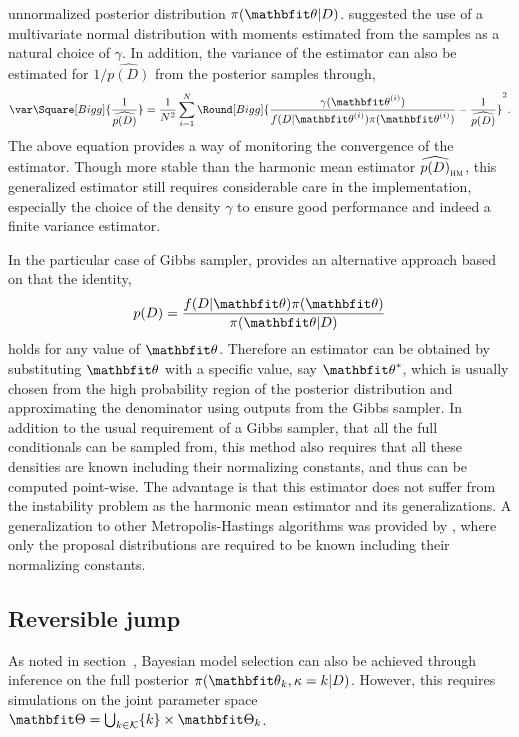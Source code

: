 \documentclass[11pt, hyper, bib, fontset=Minion]{marticle}
\begin{document}
unnormalized posterior distribution $\pi(\bth|D)$. \textcite{Gelfand:1994ux}
suggested the use of a multivariate normal distribution with moments estimated
from the samples as a natural choice of $\gamma$. In addition, the variance of
the estimator can also be estimated for $1/\widehat{p(D)}$ from the posterior
samples through,
\begin{equation}
  \var\Square[Bigg]{\frac{1}{\widehat{p(D)}}} =
  \frac{1}{N^2}\sum_{i=1}^N \Round[Bigg]{
    \frac{\gamma(\bthiu)}{f(D|\bthiu)\pi(\bthiu)}
    - \frac{1}{\widehat{p(D)}}}^2.
\end{equation}
The above equation provides a way of monitoring the convergence of the
estimator. Though more stable than the harmonic mean estimator
$\widehat{p(D)}_{\text{\textsc{hm}}}$, this generalized estimator still
requires considerable care in the implementation, especially the choice of the
density $\gamma$ to ensure good performance and indeed a finite variance
estimator.

In the particular case of Gibbs sampler, \textcite{Chib:1995em} provides an
alternative approach based on that the identity,
\begin{equation}
  p(D) = \frac{f(D|\bth)\pi(\bth)}{\pi(\bth|D)}
\end{equation}
holds for any value of $\bth$. Therefore an estimator can be obtained by
substituting $\bth$ with a specific value, say $\bth^*$, which is usually
chosen from the high probability region of the posterior distribution and
approximating the denominator using outputs from the Gibbs sampler. In
addition to the usual requirement of a Gibbs sampler, that all the full
conditionals can be sampled from, this method also requires that all these
densities are known including their normalizing constants, and thus can be
computed point-wise. The advantage is that this estimator does not suffer from
the instability problem as the harmonic mean estimator and its
generalizations. A generalization to other Metropolis-Hastings algorithms was
provided by \textcite{Chib:2001gq}, where only the proposal distributions are
required to be known including their normalizing constants.

\subsection{Reversible jump \protect\mcmc}
\label{sub:Reversible jump mcmc}

As noted in section~, Bayesian model selection
can also be achieved through inference on the full posterior
$\pi(\bth_k,\kappa=k|D)$. However, this requires simulations on the joint
parameter space $\bTh = \bigcup_{k\in\calK}\{k\}\times\bTh_k$.
\end{document}
